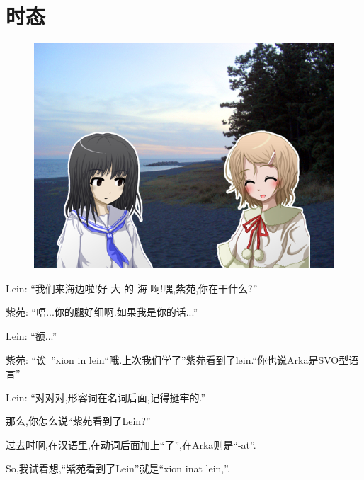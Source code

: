 \chapter[时态]{时态}


\begin{figure}[H]
\includegraphics[width=1\textwidth]{ARKA/tier2.jpg}
\end{figure}

Lein: ``我们来海边啦!好-大-的-海-啊!嘿,紫苑,你在干什么?''

紫苑: ``唔...你的腿好细啊.如果我是你的话...''

Lein: ``额...''

紫苑: ``诶~''xion in lein``哦.上次我们学了''紫苑看到了lein.``你也说Arka是SVO型语言''

Lein: ``对对对,形容词在名词后面,记得挺牢的.''


那么,你怎么说``紫苑看到了Lein?''


过去时啊,在汉语里,在动词后面加上``了'',在Arka则是``-at''.


So,我试着想,``紫苑看到了Lein''就是``xion inat lein,''.

